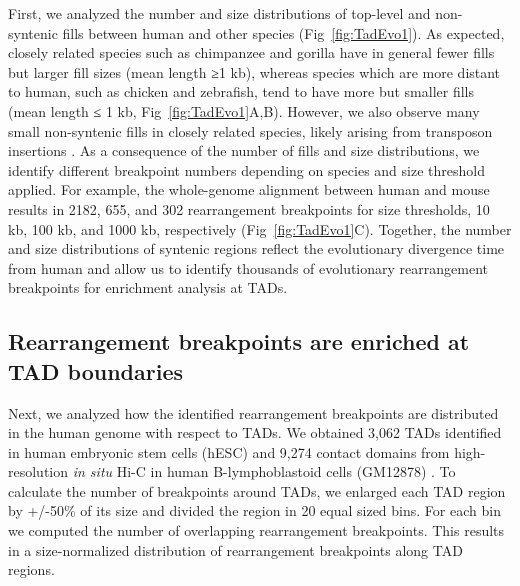 \documentclass[a4paper,twoside=true,openright,parskip=full,chapterprefix=true,11pt,headings=normal,bibliography=totoc,listof=totoc,titlepage=on,captions=tableabove,draft=false]{scrreprt}
\theoremstyle{definition}
\theoremstyle{definition}
\theoremstyle{definition}
\theoremstyle{remark}
\begin{document}
First, we analyzed the number and size distributions of top-level and
non-syntenic fills between human and other species
(Fig~\ref{fig:TadEvo1}). As expected, closely related species such as
chimpanzee and gorilla have in general fewer fills but larger fill sizes
(mean length ≥1 kb), whereas species which are more distant to human,
such as chicken and zebrafish, tend to have more but smaller fills (mean
length ≤ 1 kb, Fig~\ref{fig:TadEvo1}A,B). However, we also observe many
small non-syntenic fills in closely related species, likely arising from
transposon insertions \citep{Mills2006}. As a consequence of the number
of fills and size distributions, we identify different breakpoint
numbers depending on species and size threshold applied. For example,
the whole-genome alignment between human and mouse results in 2182, 655,
and 302 rearrangement breakpoints for size thresholds, 10 kb, 100 kb,
and 1000 kb, respectively (Fig~\ref{fig:TadEvo1}C). Together, the number
and size distributions of syntenic regions reflect the evolutionary
divergence time from human and allow us to identify thousands of
evolutionary rearrangement breakpoints for enrichment analysis at TADs.

\subsection{Rearrangement breakpoints are enriched at TAD
boundaries}\label{rearrangement-breakpoints-are-enriched-at-tad-boundaries}

Next, we analyzed how the identified rearrangement breakpoints are
distributed in the human genome with respect to TADs. We obtained 3,062
TADs identified in human embryonic stem cells (hESC) \citep{Dixon2012}
and 9,274 contact domains from high-resolution \emph{in situ} Hi-C in
human B-lymphoblastoid cells (GM12878) \citep{Rao2014}. To calculate the
number of breakpoints around TADs, we enlarged each TAD region by
+/-50\% of its size and divided the region in 20 equal sized bins. For
each bin we computed the number of overlapping rearrangement
breakpoints. This results in a size-normalized distribution of
rearrangement breakpoints along TAD regions.
\end{document}
